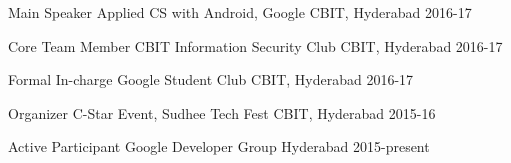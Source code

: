 

\begin{cvhonors}


\cvhonor
    {Main Speaker} %
    {Applied CS with Android, Google} %
    {CBIT, Hyderabad} %
    {2016-17} %
    

  \cvhonor
    {Core Team Member} %
    {CBIT Information Security Club} %
    {CBIT, Hyderabad} %
    {2016-17} %

 \cvhonor
    {Formal In-charge} %
    {Google Student Club} %
    {CBIT, Hyderabad} %
    {2016-17} %

\cvhonor
    {Organizer} %
    {C-Star Event, Sudhee Tech Fest} %
    {CBIT, Hyderabad} %
    {2015-16} %

\cvhonor
    {Active Participant} %
    {Google Developer Group} %
    {Hyderabad} %
    {2015-present} %

\end{cvhonors}
